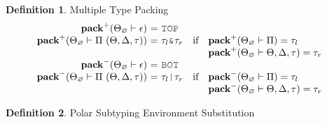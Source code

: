 \documentclass[acmsmall]{acmart}
\theoremstyle{definition}
\newtheorem{definition}{Definition}[section]
\begin{document}
\begin{definition}
  \label{def:multiple_type_packing}
  Multiple Type Packing 
  \hfill
  \ 
  \\
  \[
  \begin{array}[t]{r@{}c@{}lcl}
      \textbf{pack}^+(\Theta_\ignore \entails \epsilon) 
      &\ =\ & 
      \J{TOP} 

      \\

      \textbf{pack}^+(\Theta_\ignore \entails \Pi\ (\Theta, \Delta, \tau)) 
      &\ =\ & 
      \tau_l \J{\&} \tau_r
      &\text{if}& 
      \begin{array}[t]{@{}l}
        \textbf{pack}^+(\Theta_\ignore \entails \Pi) = \tau_l 
        \\
        \textbf{pack}^+(\Theta_\ignore \entails \Theta, \Delta, \tau) = \tau_r
      \end{array}

      \\

      \textbf{pack}^-(\Theta_\ignore \entails \epsilon) 
      &\ =\ & 
      \J{BOT} 

      \\

      \textbf{pack}^-(\Theta_\ignore \entails \Pi\ (\Theta, \Delta, \tau))
      &\ =\ & 
      \tau_l \J{|} \tau_r
      &\text{if}& 
      \begin{array}[t]{@{}l}
        \textbf{pack}^-(\Theta_\ignore \entails \Pi) = \tau_l
        \\
        \textbf{pack}^-(\Theta_\ignore \entails \Theta, \Delta, \tau) = \tau_r
      \end{array}
  \end{array}
  \]
\end{definition}


\begin{definition}
  \label{def:polar_subtyping_environment_substitution}
  Polar Subtyping Environment Substitution 
  \hfill
  \small
  \boxed{\Delta[\alpha\slash\tau]^\pm = \Delta}\ 
  \\
  \begin{mathpar}
  \end{mathpar}
\end{definition}
\end{document}
